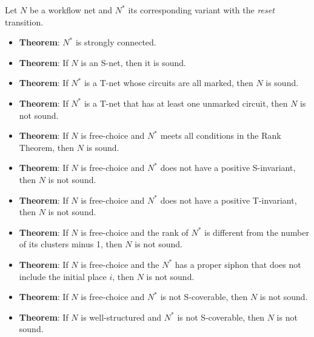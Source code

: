 \bigskip
Let $N$ be a workflow net and $N^*$ its corresponding variant with the \emph{reset} transition.
\begin{itemize}
  \item \textbf{Theorem}: $N^*$ is strongly connected.
  \item \textbf{Theorem}: If $N$ is an S-net, then it is sound.
  \item \textbf{Theorem}: If $N^*$ is a T-net whose circuits are all marked, then $N$ is sound.
  \item \textbf{Theorem}: If $N^*$ is a T-net that has at least one unmarked circuit, then $N$ is not sound.
  \item \textbf{Theorem}: If $N$ is free-choice and $N^*$ meets all conditions in the Rank Theorem, then $N$ is sound.
  \item \textbf{Theorem}: If $N$ is free-choice and $N^*$ does not have a positive S-invariant, then $N$ is not sound.
  \item \textbf{Theorem}: If $N$ is free-choice and $N^*$ does not have a positive T-invariant, then $N$ is not sound.
  \item \textbf{Theorem}: If $N$ is free-choice and the rank of $N^*$ is different from the number of its clusters minus 1, then $N$ is not sound.
  \item \textbf{Theorem}: If $N$ is free-choice and the $N^*$ has a proper siphon that does not include the initial place $i$, then $N$ is not sound.
  \item \textbf{Theorem}: If $N$ is free-choice and $N^*$ is not S-coverable, then $N$ is not sound.
  \item \textbf{Theorem}: If $N$ is well-structured and $N^*$ is not S-coverable, then $N$ is not sound.
\end{itemize}

\normalsize
